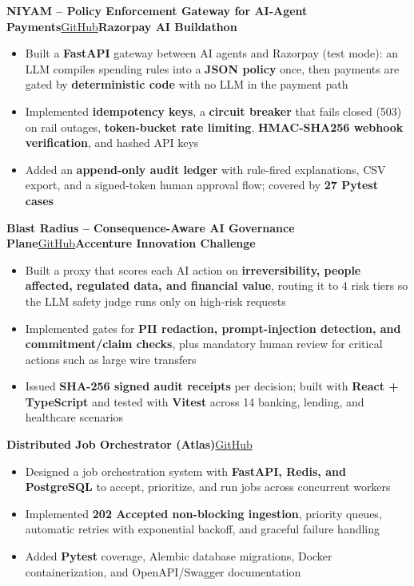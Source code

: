 \documentclass[a4paper,11pt]{article}
\newcommand{\proj}[2]{\vspace{4pt}\textbf{#1}\hfill{\small #2}\par\vspace{1pt}}
\begin{document}
\proj{NIYAM -- Policy Enforcement Gateway for AI-Agent Payments}{\href{https://github.com/pranav172/niyam}{GitHub}\hspace{0.6em}\textbf{Razorpay AI Buildathon}}
\begin{itemize}
    \item Built a \textbf{FastAPI} gateway between AI agents and Razorpay (test mode): an LLM compiles spending rules into a \textbf{JSON policy} once, then payments are gated by \textbf{deterministic code} with no LLM in the payment path
    \item Implemented \textbf{idempotency keys}, a \textbf{circuit breaker} that fails closed (503) on rail outages, \textbf{token-bucket rate limiting}, \textbf{HMAC-SHA256 webhook verification}, and hashed API keys
    \item Added an \textbf{append-only audit ledger} with rule-fired explanations, CSV export, and a signed-token human approval flow; covered by \textbf{27 Pytest cases}
\end{itemize}

\proj{Blast Radius -- Consequence-Aware AI Governance Plane}{\href{https://github.com/pranav172/blastRadius}{GitHub}\hspace{0.6em}\textbf{Accenture Innovation Challenge}}
\begin{itemize}
    \item Built a proxy that scores each AI action on \textbf{irreversibility, people affected, regulated data, and financial value}, routing it to 4 risk tiers so the LLM safety judge runs only on high-risk requests
    \item Implemented gates for \textbf{PII redaction, prompt-injection detection, and commitment/claim checks}, plus mandatory human review for critical actions such as large wire transfers
    \item Issued \textbf{SHA-256 signed audit receipts} per decision; built with \textbf{React + TypeScript} and tested with \textbf{Vitest} across 14 banking, lending, and healthcare scenarios
\end{itemize}

\proj{Distributed Job Orchestrator (Atlas)}{\href{https://github.com/pranav172/Cloud-Data-Integration-Platform-}{GitHub}}
\begin{itemize}
    \item Designed a job orchestration system with \textbf{FastAPI, Redis, and PostgreSQL} to accept, prioritize, and run jobs across concurrent workers
    \item Implemented \textbf{202 Accepted non-blocking ingestion}, priority queues, automatic retries with exponential backoff, and graceful failure handling
    \item Added \textbf{Pytest} coverage, Alembic database migrations, Docker containerization, and OpenAPI/Swagger documentation
\end{itemize}
\end{document}
